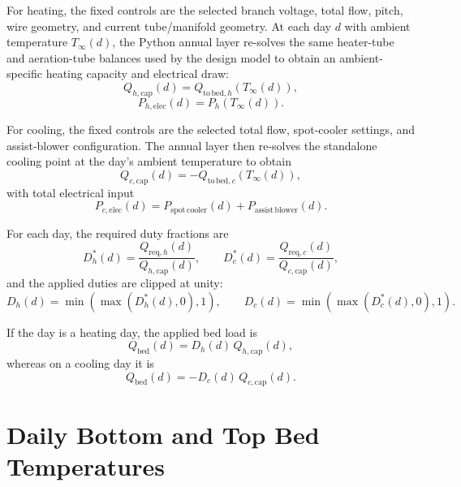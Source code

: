 \documentclass{article}
\begin{document}
For heating, the fixed controls are the selected branch voltage, total flow,
pitch, wire geometry, and current tube/manifold geometry. At each day $d$
with ambient temperature $T_\infty(d)$, the Python annual layer re-solves the
same heater-tube and aeration-tube balances used by the design model to
obtain an ambient-specific heating capacity and electrical draw:
\begin{equation}
Q_{h,\mathrm{cap}}(d)
=
Q_{\mathrm{to\,bed},h}\!\left(T_\infty(d)\right),
\end{equation}
\begin{equation}
P_{h,\mathrm{elec}}(d)
=
P_h\!\left(T_\infty(d)\right).
\end{equation}

For cooling, the fixed controls are the selected total flow, spot-cooler
settings, and assist-blower configuration. The annual layer then re-solves
the standalone cooling point at the day's ambient temperature to obtain
\begin{equation}
Q_{c,\mathrm{cap}}(d)
=
-Q_{\mathrm{to\,bed},c}\!\left(T_\infty(d)\right),
\end{equation}
with total electrical input
\begin{equation}
P_{c,\mathrm{elec}}(d)
=
P_{\mathrm{spot\,cooler}}(d) + P_{\mathrm{assist\,blower}}(d).
\end{equation}

For each day, the required duty fractions are
\begin{equation}
D_h^\ast(d) = \frac{Q_{\mathrm{req},h}(d)}{Q_{h,\mathrm{cap}}(d)},
\qquad
D_c^\ast(d) = \frac{Q_{\mathrm{req},c}(d)}{Q_{c,\mathrm{cap}}(d)},
\end{equation}
and the applied duties are clipped at unity:
\begin{equation}
D_h(d)=\min(\max(D_h^\ast(d),0),1),
\qquad
D_c(d)=\min(\max(D_c^\ast(d),0),1).
\end{equation}

If the day is a heating day, the applied bed load is
\begin{equation}
Q_{\mathrm{bed}}(d) = D_h(d)\,Q_{h,\mathrm{cap}}(d),
\end{equation}
whereas on a cooling day it is
\begin{equation}
Q_{\mathrm{bed}}(d) = -D_c(d)\,Q_{c,\mathrm{cap}}(d).
\end{equation}

\section{Daily Bottom and Top Bed Temperatures}
\end{document}
